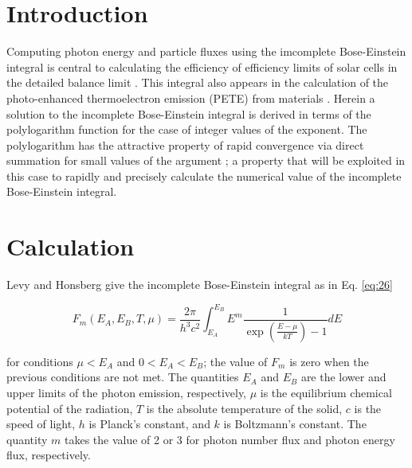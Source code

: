 \documentclass[letterpaper,12pt]{article}
\title{\Title}
\author{\AuthorName}
\begin{document}
\maketitle


\begin{abstract}
The canonical incomplete Bose-Einstein integral is expressed in terms of a finite sum of polylogarithm functions.
\end{abstract}


\section{Introduction}
Computing photon energy and particle fluxes using the imcomplete Bose-Einstein integral is central to calculating the efficiency of efficiency limits of solar cells in the detailed balance limit \cite{10.1063/1.1736034}. This integral also appears in the calculation of the photo-enhanced thermoelectron emission (PETE) from materials \cite{10.1038/nmat2814}. Herein a solution to the incomplete Bose-Einstein integral is derived in terms of the polylogarithm function for the case of integer values of the exponent. The polylogarithm has the attractive property of rapid convergence via direct summation for small values of the argument \cite{http://academic.reed.edu/physics/faculty/crandall/papers/Polylog}; a property that will be exploited in this case to rapidly and precisely calculate the numerical value of the incomplete Bose-Einstein integral.


\section{Calculation}
Levy and Honsberg \cite{10.1016/j.sse.2006.06.017} give the incomplete Bose-Einstein integral as in Eq. \ref{eq:26}

\begin{equation} \label{eq:26}
F_{m}(E_{A},E_{B},T,\mu) = \frac{2 \pi}{h^{3}c^{2}} \int_{E_{A}}^{E_{B}} E^{m} \frac{1}{\exp \left( \frac{E - \mu}{kT} \right) - 1} dE 
\end{equation}


\noindent for conditions $\mu < E_{A}$ and $0 < E_{A} < E_{B}$; the value of $F_{m}$ is zero when the previous conditions are not met. The quantities $E_{A}$ and $E_{B}$ are the lower and upper limits of the photon emission, respectively, $\mu$ is the equilibrium chemical potential of the radiation, $T$ is the absolute temperature of the solid, $c$ is the speed of light, $h$ is Planck's constant, and $k$ is Boltzmann's constant. The quantity $m$ takes the value of 2 or 3 for photon number flux and photon energy flux, respectively.
\end{document}
